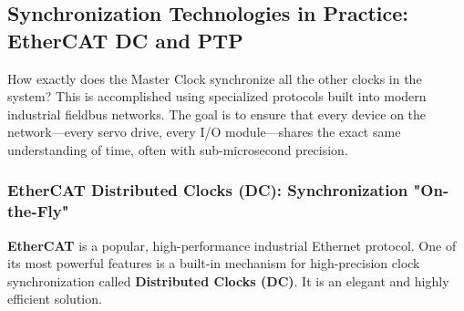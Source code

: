 


\subsection{Synchronization Technologies in Practice: EtherCAT DC and PTP}
\label{subsec:sync_technologies}

How exactly does the Master Clock synchronize all the other clocks in the system? This is accomplished using specialized protocols built into modern industrial fieldbus networks. The goal is to ensure that every device on the network—every servo drive, every I/O module—shares the exact same understanding of time, often with sub-microsecond precision.

\subsubsection{EtherCAT Distributed Clocks (DC): Synchronization "On-the-Fly"}
\label{subsubsec:ethercat_dc}

\textbf{EtherCAT} is a popular, high-performance industrial Ethernet protocol. One of its most powerful features is a built-in mechanism for high-precision clock synchronization called \textbf{Distributed Clocks (DC)}. It is an elegant and highly efficient solution.

